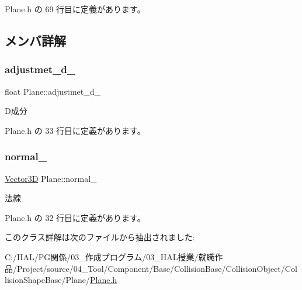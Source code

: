 Plane.\+h の 69 行目に定義があります。



\subsection{メンバ詳解}
\mbox{\label{class_plane_ab43e3263bd879ea710936d85cacb6006}} 
\subsubsection{\texorpdfstring{adjustmet\+\_\+d\+\_\+}{adjustmet\_d\_}}
{\footnotesize\ttfamily float Plane\+::adjustmet\+\_\+d\+\_\+\hspace{0.3cm}{\ttfamily [private]}}



D成分 



 Plane.\+h の 33 行目に定義があります。

\mbox{\label{class_plane_a7ae74465500dfdd7a68fa2eb28486ae0}} 
\subsubsection{\texorpdfstring{normal\+\_\+}{normal\_}}
{\footnotesize\ttfamily \mbox{\hyperlink{class_vector3_d}{Vector3D}} Plane\+::normal\+\_\+\hspace{0.3cm}{\ttfamily [private]}}



法線 



 Plane.\+h の 32 行目に定義があります。



このクラス詳解は次のファイルから抽出されました\+:\begin{DoxyCompactItemize}
\item 
C\+:/\+H\+A\+L/\+P\+G関係/03\+\_\+作成プログラム/03\+\_\+\+H\+A\+L授業/就職作品/\+Project/source/04\+\_\+\+Tool/\+Component/\+Base/\+Collision\+Base/\+Collision\+Object/\+Collision\+Shape\+Base/\+Plane/\mbox{\hyperlink{_plane_8h}{Plane.\+h}}\end{DoxyCompactItemize}
